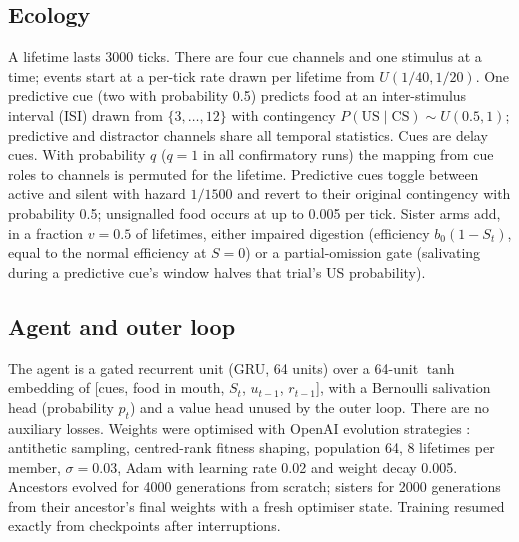 \documentclass[conference]{IEEEtran}
\begin{document}
\subsection{Ecology}
A lifetime lasts 3000 ticks. There are four cue channels and one stimulus at a time; events start at a per-tick rate drawn per lifetime from $U(1/40,1/20)$. One predictive cue (two with probability 0.5) predicts food at an inter-stimulus interval (ISI) drawn from $\{3,\dots,12\}$ with contingency $P(\mathrm{US}\mid\mathrm{CS})\sim U(0.5,1)$; predictive and distractor channels share all temporal statistics. Cues are delay cues. With probability $q$ ($q=1$ in all confirmatory runs) the mapping from cue roles to channels is permuted for the lifetime. Predictive cues toggle between active and silent with hazard $1/1500$ and revert to their original contingency with probability 0.5; unsignalled food occurs at up to 0.005 per tick. Sister arms add, in a fraction $v=0.5$ of lifetimes, either impaired digestion (efficiency $b_0(1-S_t)$, equal to the normal efficiency at $S=0$) or a partial-omission gate (salivating during a predictive cue's window halves that trial's US probability).

\subsection{Agent and outer loop}
The agent is a gated recurrent unit (GRU, 64 units) over a 64-unit $\tanh$ embedding of [cues, food in mouth, $S_t$, $u_{t-1}$, $r_{t-1}$], with a Bernoulli salivation head (probability $p_t$) and a value head unused by the outer loop. There are no auxiliary losses. Weights were optimised with OpenAI evolution strategies \cite{salimans17}: antithetic sampling, centred-rank fitness shaping, population 64, 8 lifetimes per member, $\sigma=0.03$, Adam with learning rate 0.02 and weight decay 0.005. Ancestors evolved for 4000 generations from scratch; sisters for 2000 generations from their ancestor's final weights with a fresh optimiser state. Training resumed exactly from checkpoints after interruptions.
\end{document}
